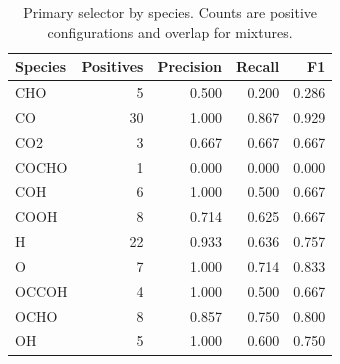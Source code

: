 \begin{table}[htbp]\centering\small
\caption{Primary selector by species. Counts are positive configurations and overlap for mixtures.}\label{tab:species}
\begin{tabular}{@{}lrrrr@{}}\toprule
Species & Positives & Precision & Recall & F1\\\midrule
CHO & 5 & 0.500 & 0.200 & 0.286\\
CO & 30 & 1.000 & 0.867 & 0.929\\
CO2 & 3 & 0.667 & 0.667 & 0.667\\
COCHO & 1 & 0.000 & 0.000 & 0.000\\
COH & 6 & 1.000 & 0.500 & 0.667\\
COOH & 8 & 0.714 & 0.625 & 0.667\\
H & 22 & 0.933 & 0.636 & 0.757\\
O & 7 & 1.000 & 0.714 & 0.833\\
OCCOH & 4 & 1.000 & 0.500 & 0.667\\
OCHO & 8 & 0.857 & 0.750 & 0.800\\
OH & 5 & 1.000 & 0.600 & 0.750\\
\bottomrule
\end{tabular}
\end{table}
